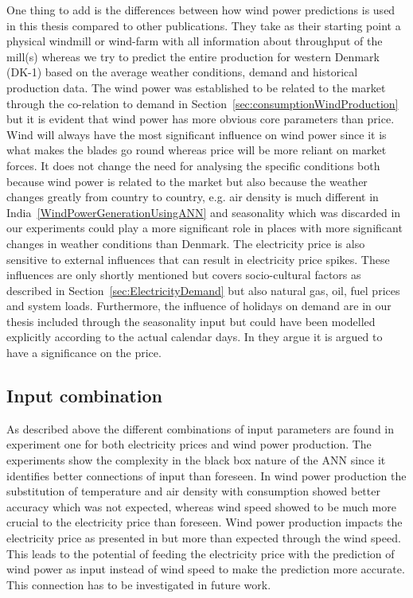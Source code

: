 One thing to add is the differences between how wind power predictions is used in this thesis compared to other publications. They take as their starting point a physical windmill or wind-farm with all information about throughput of the mill(s)\cite{windForecastPortugal,ShortTermWindPowerForecasting,dayAheadImpactOfWindPowerForecasts,WindPowerGenerationUsingANN} whereas we try to predict the entire production for western Denmark (DK-1) based on the average weather conditions, demand and historical production data. The wind power was established to be related to the market through the co-relation to demand in Section~\ref{sec:consumptionWindProduction} but it is evident that wind power has more obvious core parameters than price. Wind will always have the most significant influence on wind power since it is what makes the blades go round whereas price will be more reliant on market forces. It does not change the need for analysing the specific conditions both because wind power is related to the market but also because the weather changes greatly from country to country, e.g. air density is much different in India~\ref{WindPowerGenerationUsingANN} and seasonality which was discarded in our experiments could play a more significant role in places with more significant changes in weather conditions than Denmark. The electricity price is also sensitive to external influences that can result in electricity price spikes\cite{singhal2011electricity}. These influences are only shortly mentioned but covers socio-cultural factors as described in Section~\ref{sec:ElectricityDemand} but also natural gas, oil, fuel prices and system loads\cite{singhal2011electricity}. Furthermore, the influence of holidays on demand are in our thesis included through the seasonality input but could have been modelled explicitly according to the actual calendar days. In \cite{EnergyPriceForecasting,chen2004load} they argue it is argued to have a significance on the price.

\subsection{Input combination}
As described above the different combinations of input parameters are found in experiment one for both electricity prices and wind power production. The experiments show the complexity in the black box nature of the ANN since it identifies better connections of input than foreseen. In wind power production the substitution of temperature and air density with consumption showed better accuracy which was not expected, whereas wind speed showed to be much more crucial to the electricity price than foreseen. Wind power production impacts the electricity price as presented in \cite{dayAheadImpactOfWindPowerForecasts} but more than expected through the wind speed. This leads to the potential of feeding the electricity price with the prediction of wind power as input instead of wind speed to make the prediction more accurate. This connection has to be investigated in future work.

